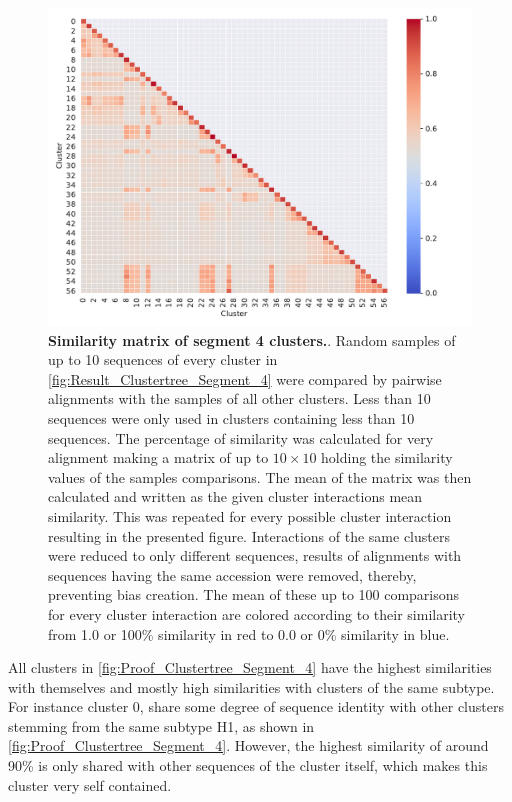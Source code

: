 \begin{figure}[!hbt]
    \centering
    \includegraphics[width=\textwidth]{Results/Cluster_Difference_Segment_4.pdf}
    \caption[Similarity matrix of segment 4 clusters]{\textbf{Similarity matrix of segment 4 clusters.}. Random samples of up to 10 sequences of every cluster in \autoref{fig:Result_Clustertree_Segment_4} were compared by pairwise alignments with the samples of all other clusters. Less than 10 sequences were only used in clusters containing less than 10 sequences. The percentage of similarity was calculated for very alignment making a matrix of up to $10\times10$ holding the similarity values of the samples comparisons. The mean of the matrix was then calculated and written as the given cluster interactions mean similarity. This was repeated for every possible cluster interaction resulting in the presented figure. Interactions of the same clusters were reduced to only different sequences, results of alignments with sequences having the same accession were removed, thereby, preventing bias creation. The mean of these up to 100 comparisons for every cluster interaction are colored according to their similarity from 1.0 or 100\% similarity in red to 0.0 or 0\% similarity in blue.}
    \label{fig:Proof_Clustertree_Segment_4}
\end{figure}

\vspace{1em}

All clusters in \autoref{fig:Proof_Clustertree_Segment_4} have the highest similarities with themselves and mostly high similarities with clusters of the same subtype. For instance cluster 0, share some degree of sequence identity with other clusters stemming from the same subtype H1, as shown in \autoref{fig:Proof_Clustertree_Segment_4}. However, the highest similarity of around 90\% is only shared with other sequences of the cluster itself, which makes this cluster very self contained. 

